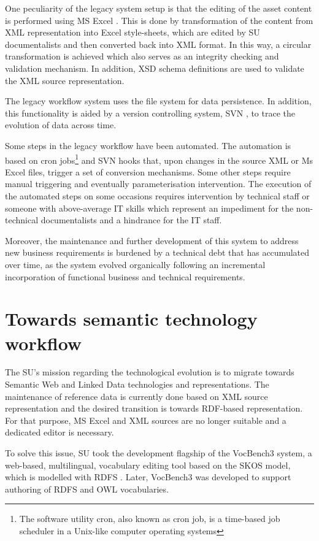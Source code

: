 	One peculiarity of the legacy system setup is that the editing of the asset content is performed using MS Excel \citep{excel}. This is done by transformation of the content from XML representation into Excel style-sheets, which are edited by SU documentalists and then converted back into XML format. In this way, a circular transformation is achieved which also serves as an integrity checking and validation mechanism. In addition, XSD \citep{xsd1.1-spec} schema definitions are used to validate the XML source representation.
	 
	The legacy workflow system uses the file system for data persistence. In addition, this functionality is aided by a version controlling system, SVN \cite{svn}, to trace the evolution of data across time.
	 
	Some steps in the legacy workflow have been automated. The automation is based on cron jobs\footnote{The software utility cron, also known as cron job, is a time-based job scheduler in a Unix-like computer operating systems} and SVN hooks that, upon changes in the source XML or Ms Excel files, trigger a set of conversion mechanisms.  Some other steps require manual triggering and eventually parameterisation intervention. The execution of the automated steps on some occasions requires intervention by technical staff or someone with above-average IT skills which represent an impediment for the non-technical documentalists and a hindrance for the IT staff.
	 
	Moreover, the maintenance and further development of this system to address new business requirements is burdened by a technical debt that has accumulated over time, as the system evolved organically following an incremental incorporation of functional business and technical requirements. 
	
	\section{Towards semantic technology workflow}
	
	The SU's mission regarding the technological evolution is to migrate towards Semantic Web and Linked Data technologies and representations. The maintenance of reference data is currently done based on XML source representation and the desired transition is towards RDF-based representation\citep{rdf11,rdf11-semantics}. For that purpose, MS Excel and XML sources are no longer suitable and a dedicated editor is necessary.
	
	To solve this issue, SU took the development flagship of the VocBench3 \citep{stellatovocbench, stellato2017towards} system, a web-based, multilingual, vocabulary editing tool based on the SKOS \citep{skos-spec} model, which is modelled with RDFS \citep{rdfs1-spec,rdfs11-spec}. Later, VocBench3 was developed to support authoring of RDFS \citep{rdfs11-spec} and OWL \citep{owl2.0} vocabularies.
	
